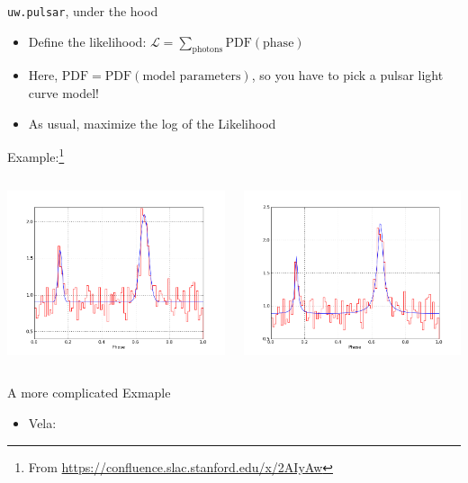 \documentclass[12pt]{beamer}
\begin{document}
\begin{frame}{\texttt{uw.pulsar}, under the hood}
  \begin{itemize}
   \item Define the likelihood: $\mathcal{L} = \sum_\text{photons}\text{PDF}(\text{phase})$
   \item Here, $\text{PDF}=\text{PDF}(\text{model parameters})$, so you have to pick a pulsar light curve model!
   \item As usual, maximize the log of the Likelihood
  \end{itemize}

  Example:\footnote{From \url{https://confluence.slac.stanford.edu/x/2AIyAw}}
  \begin{columns}

    \includegraphics[width=1\textwidth]{plots/template_example_gauss.png}

    \includegraphics[width=1\textwidth]{plots/template_example_lorentzian.png}
  \end{columns}
\end{frame}

\begin{frame}{A more complicated Exmaple}
  \begin{itemize}
    \item Vela:
  \end{itemize}

\end{frame}
\end{document}
